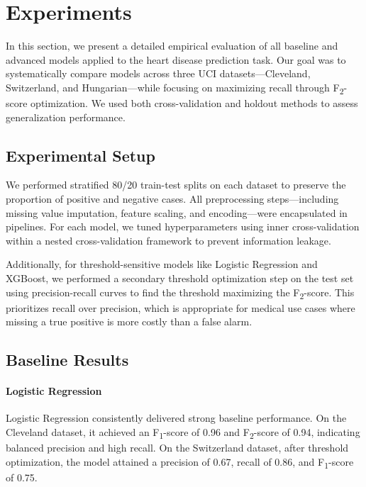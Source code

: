 \documentclass{article}
\begin{document}
\section{Experiments}

In this section, we present a detailed empirical evaluation of all baseline and advanced models applied to the heart disease prediction task. Our goal was to systematically compare models across three UCI datasets—Cleveland, Switzerland, and Hungarian—while focusing on maximizing recall through F\textsubscript{2}-score optimization. We used both cross-validation and holdout methods to assess generalization performance.

\subsection{Experimental Setup}

We performed stratified 80/20 train-test splits on each dataset to preserve the proportion of positive and negative cases. All preprocessing steps—including missing value imputation, feature scaling, and encoding—were encapsulated in pipelines. For each model, we tuned hyperparameters using inner cross-validation within a nested cross-validation framework to prevent information leakage.

Additionally, for threshold-sensitive models like Logistic Regression and XGBoost, we performed a secondary threshold optimization step on the test set using precision-recall curves to find the threshold maximizing the F\textsubscript{2}-score. This prioritizes recall over precision, which is appropriate for medical use cases where missing a true positive is more costly than a false alarm.

\subsection{Baseline Results}

\paragraph{Logistic Regression}
Logistic Regression consistently delivered strong baseline performance. On the Cleveland dataset, it achieved an F\textsubscript{1}-score of 0.96 and F\textsubscript{2}-score of 0.94, indicating balanced precision and high recall. On the Switzerland dataset, after threshold optimization, the model attained a precision of 0.67, recall of 0.86, and F\textsubscript{1}-score of 0.75.
\end{document}
